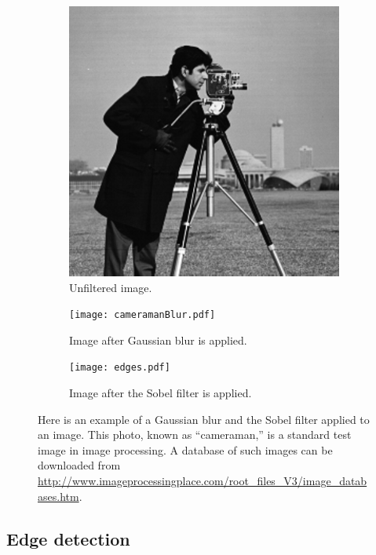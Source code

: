 \begin{figure}
\centering
\begin{subfigure}[b]{.49\textwidth}
\centering
\includegraphics[width=\textwidth]{cameraman.png}
\caption{Unfiltered image.}
\label{fig:cameraman}
\end{subfigure}
\begin{subfigure}[b]{.49\textwidth}
\centering
\texttt{[image: cameramanBlur.pdf]}
\caption{Image after Gaussian blur is applied.}
\label{fig:cameraman_blur}
\end{subfigure}
\begin{subfigure}[b]{.49\textwidth}
\centering
\texttt{[image: edges.pdf]}
\caption{Image after the Sobel filter is applied.}
\label{fig:cameraman_edges}
\end{subfigure}
\caption{Here is an example of a Gaussian blur and the Sobel filter applied to an image. 
This photo, known as ``cameraman,'' is a standard test image in image processing. 
A database of such images can be downloaded from \url{http://www.imageprocessingplace.com/root_files_V3/image_databases.htm}.}
\label{fig:cameraman1}
\end{figure}



\subsection*{Edge detection}


